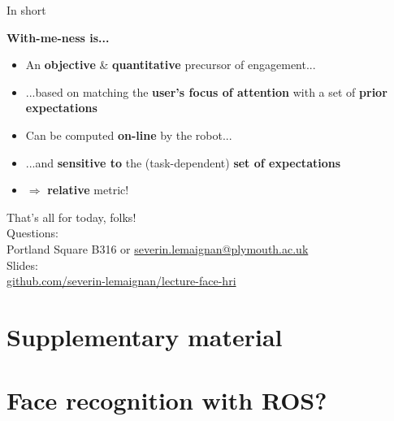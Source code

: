 \documentclass[compress]{beamer}
\makeatletter
\def\beamer@writeslidentry@miniframesoff{%
  \expandafter\beamer@ifempty\expandafter{\beamer@framestartpage}{}%
  {%
    \clearpage\beamer@notesactions%
  }
}
\newcommand*{\miniframesoff}{\let\beamer@writeslidentry=\beamer@writeslidentry@miniframesoff}
\makeatother
\begin{document}
{%

\begin{frame}{In short}

    {\bf With-me-ness is...}

    \begin{itemize}
        \item An {\bf objective} \& {\bf quantitative} precursor of engagement...
        \item ...based on matching the {\bf user's focus of attention} with a set of
            {\bf prior expectations}
        \item Can be computed {\bf on-line} by the robot...
        \item ...and {\bf sensitive to} the (task-dependent) {\bf set of
            expectations}
        \item $\Rightarrow$ {\bf relative} metric!
    \end{itemize}

\end{frame}


\miniframesoff

\begin{frame}{}
    \begin{center}
        \Large
        That's all for today, folks!\\[2em]
        \normalsize
        Questions:\\
        Portland Square B316 or \url{severin.lemaignan@plymouth.ac.uk} \\[1em]

        Slides:\\
        \href{https://github.com/severin-lemaignan/lecture-face-hri}{\small
        github.com/severin-lemaignan/lecture-face-hri}

    \end{center}
\end{frame}



\section[]{Supplementary material}

\section[]{Face recognition with ROS?}

}
\end{document}
